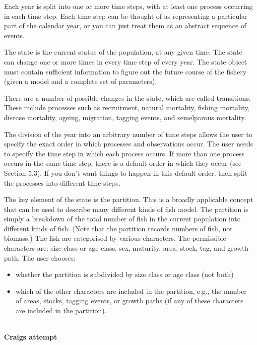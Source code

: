 Each year is split into one or more time steps, with at least one process occurring in each time step. Each time step can be thought of as representing a particular part of the calendar year, or you can just treat them as an abstract sequence of events.

The state is the current status of the population, at any given time. The state can change one or more times in every time step of every year. The state object must contain sufficient information to figure out the future course of the fishery (given a model and a complete set of parameters).

There are a number of possible changes in the state, which are called transitions. These include processes such as recruitment, natural mortality, fishing mortality, disease mortality, ageing, migration, tagging events, and semelparous mortality.

The division of the year into an arbitrary number of time steps allows the user to specify the exact order in which processes and observations occur. The user needs to specify the time step in which each process occurs. If more than one process occurs in the same time step, there is a default order in which they occur (see Section 5.3). If you don’t want things to happen in this default order, then split the processes into different time steps.


The key element of the state is the partition. This is a broadly applicable concept that can be used to describe many different kinds of fish model. The partition is simply a breakdown of the total number of fish in the current population into different kinds of fish. (Note that the partition records numbers of fish, not biomass.) The fish are categorised by various characters. The permissible characters are: size class or age class, sex, maturity, area, stock, tag, and growth-path. The user chooses:

\begin{itemize}
\item	whether the partition is subdivided by size class or age class (not both)
\item	which of the other characters are included in the partition, e.g., the number of areas, stocks, tagging events, or growth paths (if any of these characters are included in the partition).
\end{itemize}
\\ 
\textbf{Craigs attempt}\\

